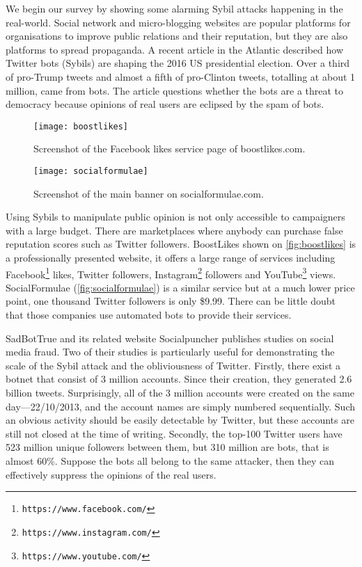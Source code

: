 We begin our survey by showing some alarming Sybil attacks happening in the
real-world. Social network and micro-blogging websites are popular platforms for
organisations to improve public relations and their reputation, but they are
also platforms to spread propaganda. A recent article in the Atlantic described
how Twitter bots (Sybils) are shaping the 2016 US presidential
election\cite{atlantictwitterbots}. Over a third of pro-Trump tweets and almost
a fifth of pro-Clinton tweets, totalling at about 1 million, came from bots. The
article questions whether the bots are a threat to democracy because opinions of
real users are eclipsed by the spam of bots.

\begin{figure}
  \centering
  \texttt{[image: boostlikes]}
  \caption{Screenshot of the Facebook likes service page of boostlikes.com.}
  \label{fig:boostlikes}
\end{figure}

\begin{figure*}
  \centering
  \texttt{[image: socialformulae]}
  \caption{Screenshot of the main banner on socialformulae.com.}
  \label{fig:socialformulae}
\end{figure*}

Using Sybils to manipulate public opinion is not only accessible to campaigners
with a large budget. There are marketplaces where anybody can purchase false
reputation scores such as Twitter followers. BoostLikes shown on
\autoref{fig:boostlikes} is a professionally presented website, it offers a
large range of services including
Facebook\footnote{\texttt{https://www.facebook.com/}} likes, Twitter followers,
Instagram\footnote{\texttt{https://www.instagram.com/}} followers and
YouTube\footnote{\texttt{https://www.youtube.com/}} views. SocialFormulae
(\autoref{fig:socialformulae}) is a similar service but at a much lower price
point, one thousand Twitter followers is only \$9.99. There can be little doubt
that those companies use automated bots to provide their services.

SadBotTrue and its related website Socialpuncher publishes studies on social
media fraud. Two of their studies is particularly useful for demonstrating the
scale of the Sybil attack and the obliviousness of Twitter. Firstly, there exist
a botnet that consist of 3 million accounts. Since their creation, they
generated 2.6 billion tweets. Surprisingly, all of the 3 million accounts were
created on the same day---22/10/2013, and the account names are simply
numbered sequentially\cite{sadbottrue}. Such an obvious activity should be
easily detectable by Twitter, but these accounts are still not closed at the
time of writing. Secondly, the top-100 Twitter users have 523 million unique
followers between them, but 310 million are bots, that is almost
60\%\cite{socialpuncher}. Suppose the bots all belong to the same attacker, then
they can effectively suppress the opinions of the real users.

